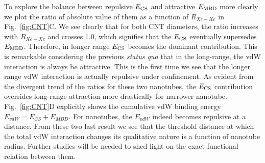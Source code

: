 \documentclass[aps,prl,groupaddress, twocolumn]{revtex4-1}  %
\begin{document}
To explore the balance between repulsive $E_{\rm CS}$ and attractive $E_{\rm MBD}$ more clearly we plot the ratio of absolute value of them as a function of $R_{Xe-Xe}$ in Fig.~\ref{fig:CNT}C. We see clearly that for both CNT diameters, the ratio increases with $R_{Xe-Xe}$ and crosses 1.0, which signifies that the $E_{\rm CS}$ eventually supersedes $E_{\rm MBD}$. Therefore, in longer range $E_{\rm CS}$ becomes the dominant contribution. This is remarkable considering the previous \textit{status quo} that in the long-range, the vdW interaction is always be attractive. This is the first time we see that the longer range vdW interaction is actually repulsive under confinement. As evident from the divergent trend of the ratios for these two nanotubes, the $E_{\rm CS}$ contribution overrides long-range attraction more drastically for narrower nanotube. Fig.~\ref{fig:CNT}D explicitly shows the cumulative vdW binding energy $E_{vdW} = E_{CS} + E_{MBD}$. For nanotubes, the $E_{vdW}$ indeed becomes repulsive at a distance. From these two last result we see that the threshold distance at which the total vdW interaction changes its qualitative nature is a function of nanotube radius. Further studies will be needed to shed light on the exact functional relation between them.
\end{document}
